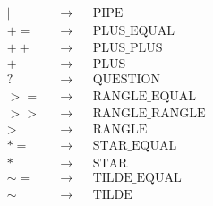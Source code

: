\documentclass[]{article}
\begin{document}
\begin{align}
    &|                     &&\to &&\text{PIPE}                  \\
    &+=                    &&\to &&\text{PLUS\_EQUAL}           \\
    &++                    &&\to &&\text{PLUS\_PLUS}            \\
    &+                     &&\to &&\text{PLUS}                  \\
    &?                     &&\to &&\text{QUESTION}              \\
    &>=                    &&\to &&\text{RANGLE\_EQUAL}         \\
    &>>                    &&\to &&\text{RANGLE\_RANGLE}        \\
    &>                     &&\to &&\text{RANGLE}                \\
    &*=                    &&\to &&\text{STAR\_EQUAL}           \\
    &*                     &&\to &&\text{STAR}                  \\
    &\sim=                 &&\to &&\text{TILDE\_EQUAL}          \\
    &\sim                  &&\to &&\text{TILDE}
\end{align}
\end{document}
